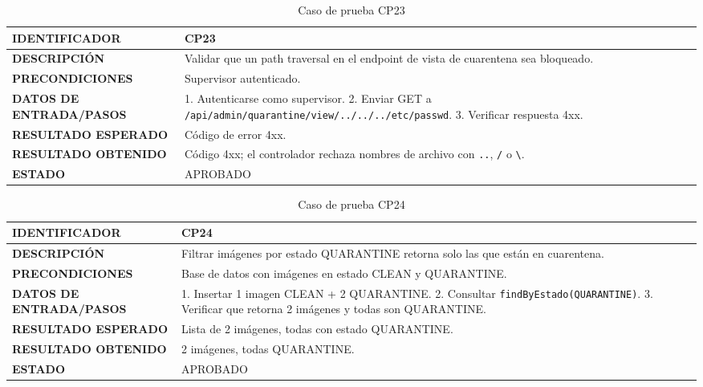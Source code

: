 \begin{table}[H]
\centering
\caption{Caso de prueba CP23}
\begin{tabular}{|p{3.5cm}|p{10.3cm}|}
\hline
\textbf{IDENTIFICADOR} & CP23 \\
\hline
\textbf{DESCRIPCIÓN} & Validar que un path traversal en el endpoint de vista de cuarentena sea bloqueado. \\
\hline
\textbf{PRECONDICIONES} & Supervisor autenticado. \\
\hline
\textbf{DATOS DE ENTRADA/PASOS} & 1. Autenticarse como supervisor. 2. Enviar GET a \texttt{/api/admin/quarantine/view/../../../etc/passwd}. 3. Verificar respuesta 4xx. \\
\hline
\textbf{RESULTADO ESPERADO} & Código de error 4xx. \\
\hline
\textbf{RESULTADO OBTENIDO} & Código 4xx; el controlador rechaza nombres de archivo con \texttt{..}, \texttt{/} o \texttt{\textbackslash}. \\
\hline
\textbf{ESTADO} & APROBADO \\
\hline
\end{tabular}
\end{table}

\begin{table}[H]
\centering
\caption{Caso de prueba CP24}
\begin{tabular}{|p{3.5cm}|p{10.3cm}|}
\hline
\textbf{IDENTIFICADOR} & CP24 \\
\hline
\textbf{DESCRIPCIÓN} & Filtrar imágenes por estado QUARANTINE retorna solo las que están en cuarentena. \\
\hline
\textbf{PRECONDICIONES} & Base de datos con imágenes en estado CLEAN y QUARANTINE. \\
\hline
\textbf{DATOS DE ENTRADA/PASOS} & 1. Insertar 1 imagen CLEAN + 2 QUARANTINE. 2. Consultar \texttt{findByEstado(QUARANTINE)}. 3. Verificar que retorna 2 imágenes y todas son QUARANTINE. \\
\hline
\textbf{RESULTADO ESPERADO} & Lista de 2 imágenes, todas con estado QUARANTINE. \\
\hline
\textbf{RESULTADO OBTENIDO} & 2 imágenes, todas QUARANTINE. \\
\hline
\textbf{ESTADO} & APROBADO \\
\hline
\end{tabular}
\end{table}

